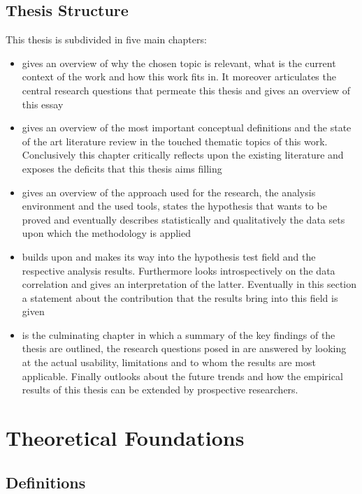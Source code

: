 \documentclass{seal_thesis}
\begin{document}
\section{Thesis Structure}

This thesis is subdivided in five main chapters:

\begin{itemize}
	\item {} gives an overview of why the chosen topic is relevant, what is the current context of the work and how this work fits in. It moreover articulates the central research questions that permeate this thesis and gives an overview of this essay
	\item {} gives an overview of the most important conceptual definitions and the state of the art literature review in the touched thematic topics of this work. Conclusively this chapter critically reflects upon the existing literature and exposes the deficits that this thesis aims filling
	\item {} gives an overview of the approach used for the research, \eg the analysis environment and the used tools, states the hypothesis that wants to be proved and eventually describes statistically and qualitatively the data sets upon which the methodology is applied
	\item {} builds upon  and makes its way into the hypothesis test field and the respective analysis results. Furthermore looks introspectively on the data correlation and gives an interpretation of the latter. Eventually in this section a statement about the contribution that the results bring into this field is given
	\item {} is the culminating chapter in which a summary of the key findings of the thesis are outlined, the research questions posed in  are answered by looking at the actual usability, limitations and to whom the results are most applicable. Finally outlooks about the future trends and how the empirical results of this thesis can be extended by prospective researchers. 
\end{itemize}

\chapter{Theoretical Foundations}
\label{ch:foundations}

\section{Definitions}
\end{document}
